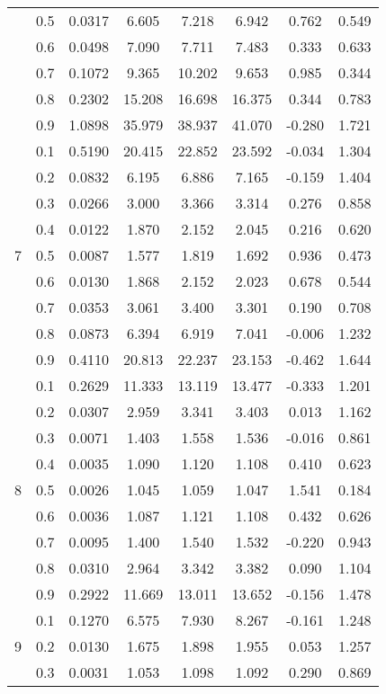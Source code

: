 \documentclass[11pt,a4paper]{report}
\begin{document}
\begin{longtable}{ | c | c || c | c | c | c | c | c | }
 & 0.5 & 0.0317 & 6.605 & 7.218 & 6.942 & 0.762 & 0.549 \\
 & 0.6 & 0.0498 & 7.090 & 7.711 & 7.483 & 0.333 & 0.633 \\
 & 0.7 & 0.1072 & 9.365 & 10.202 & 9.653 & 0.985 & 0.344 \\
 & 0.8 & 0.2302 & 15.208 & 16.698 & 16.375 & 0.344 & 0.783 \\
 & 0.9 & 1.0898 & 35.979 & 38.937 & 41.070 & -0.280 & 1.721 \\
 \hline
\multirow{9}{*}{7} & 0.1 & 0.5190 & 20.415 & 22.852 & 23.592 & -0.034 & 1.304 \\
 & 0.2 & 0.0832 & 6.195 & 6.886 & 7.165 & -0.159 & 1.404 \\
 & 0.3 & 0.0266 & 3.000 & 3.366 & 3.314 & 0.276 & 0.858 \\
 & 0.4 & 0.0122 & 1.870 & 2.152 & 2.045 & 0.216 & 0.620 \\
 & 0.5 & 0.0087 & 1.577 & 1.819 & 1.692 & 0.936 & 0.473 \\
 & 0.6 & 0.0130 & 1.868 & 2.152 & 2.023 & 0.678 & 0.544 \\
 & 0.7 & 0.0353 & 3.061 & 3.400 & 3.301 & 0.190 & 0.708 \\
 & 0.8 & 0.0873 & 6.394 & 6.919 & 7.041 & -0.006 & 1.232 \\
 & 0.9 & 0.4110 & 20.813 & 22.237 & 23.153 & -0.462 & 1.644 \\
 \hline
\multirow{9}{*}{8} & 0.1 & 0.2629 & 11.333 & 13.119 & 13.477 & -0.333 & 1.201 \\
 & 0.2 & 0.0307 & 2.959 & 3.341 & 3.403 & 0.013 & 1.162 \\
 & 0.3 & 0.0071 & 1.403 & 1.558 & 1.536 & -0.016 & 0.861 \\
 & 0.4 & 0.0035 & 1.090 & 1.120 & 1.108 & 0.410 & 0.623 \\
 & 0.5 & 0.0026 & 1.045 & 1.059 & 1.047 & 1.541 & 0.184 \\
 & 0.6 & 0.0036 & 1.087 & 1.121 & 1.108 & 0.432 & 0.626 \\
 & 0.7 & 0.0095 & 1.400 & 1.540 & 1.532 & -0.220 & 0.943 \\
 & 0.8 & 0.0310 & 2.964 & 3.342 & 3.382 & 0.090 & 1.104 \\
 & 0.9 & 0.2922 & 11.669 & 13.011 & 13.652 & -0.156 & 1.478 \\
 \hline
\multirow{9}{*}{9} & 0.1 & 0.1270 & 6.575 & 7.930 & 8.267 & -0.161 & 1.248 \\
 & 0.2 & 0.0130 & 1.675 & 1.898 & 1.955 & 0.053 & 1.257 \\
 & 0.3 & 0.0031 & 1.053 & 1.098 & 1.092 & 0.290 & 0.869 \\

\end{longtable}
\end{document}
